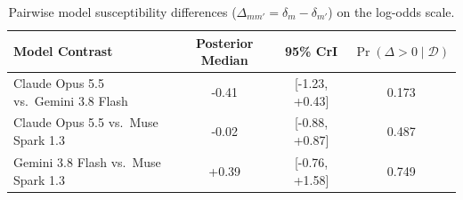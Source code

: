 \begin{table}[!ht]\centering\footnotesize
\caption{Pairwise model susceptibility differences ($\Delta_{mm'} = \delta_m - \delta_{m'}$) on the log-odds scale.}\label{tab:cross-model-differences}
\begin{tabularx}{\columnwidth}{@{}X c c c@{}}\toprule
Model Contrast & Posterior Median & 95\% CrI & $\Pr(\Delta > 0 \mid \mathcal{D})$ \\
\midrule
Claude Opus 5.5 vs.\ Gemini 3.8 Flash & -0.41 & [-1.23, +0.43] & 0.173 \\
Claude Opus 5.5 vs.\ Muse Spark 1.3 & -0.02 & [-0.88, +0.87] & 0.487 \\
Gemini 3.8 Flash vs.\ Muse Spark 1.3 & +0.39 & [-0.76, +1.58] & 0.749 \\
\bottomrule\end{tabularx}
\end{table}
